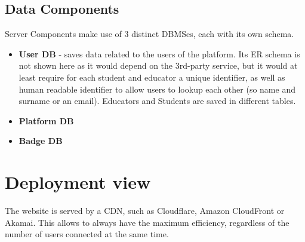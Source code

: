 \subsection{Data Components}
Server Components make use of 3 distinct DBMSes, each with its own schema.
\begin{itemize}
    \item \textbf{User DB} {-} saves data related to the users of the platform. Its ER schema is not shown
          here as it would depend on the 3rd-party service, but it would at least require for each student and
          educator a unique identifier, as well as human readable identifier to allow users to lookup each other
          (so name and surname or an email). Educators and Students are saved in different tables.
          \pagebreak
    \item \textbf{Platform DB}
          \begin{adjustbox}{
                  max size={\textwidth}{},
                  caption={Platform ER},
                  label={fig:Platform ER},
                  figure=H}
              \centering
          \end{adjustbox}
          \pagebreak
    \item \textbf{Badge DB}
          \begin{adjustbox}{
                  max size={\textwidth}{},
                  caption={Badges ER},
                  label={fig:Badges ER},
                  figure=H}
              \centering
          \end{adjustbox}
\end{itemize}
\pagebreak

\section{Deployment view}
\begin{adjustbox}{
        max size={\textwidth}{},
        caption={Deployment view diagram},
        label={fig:Deployment view diagram},
        figure=H}
    \centering
\end{adjustbox}

The website is served by a CDN, such as Cloudflare, Amazon CloudFront or Akamai.
This allows to always have the maximum efficiency, regardless of the number of users connected at the same time.


